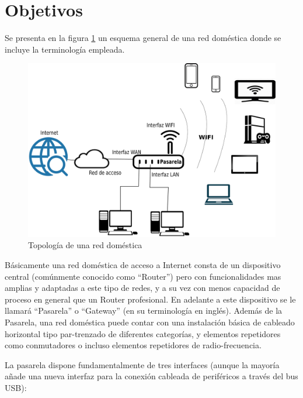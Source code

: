 \documentclass[12pt]{article}
\begin{document}
\section{Objetivos}
    Se presenta en la figura \ref{fig:red_soho} un esquema general de una red doméstica donde se incluye la terminología empleada.

    \begin{figure}[hp]
    \centering
        \includegraphics[scale=0.2]{soho_network.eps}
        \caption{Topología de una red doméstica}
        \label{fig:red_soho}
    \end{figure}

    Básicamente una red doméstica de acceso a Internet consta de un dispositivo central (comúnmente conocido como ``Router'') pero con funcionalidades mas amplias y adaptadas a este tipo de redes, y a su vez con menos capacidad de proceso en general que un Router profesional. En adelante a este dispositivo se le llamará ``Pasarela'' o ``Gateway'' (en su terminología en inglés). Además de la Pasarela, una red doméstica puede contar con una instalación básica de cableado horizontal tipo par-trenzado de diferentes categorías, y elementos repetidores como conmutadores o incluso elementos repetidores de radio-frecuencia.

    La pasarela dispone fundamentalmente de tres interfaces (aunque la mayoría añade una nueva interfaz para la conexión cableada de periféricos a través del bus USB): 
\end{document}

